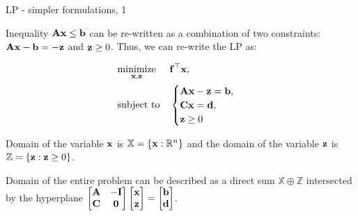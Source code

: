 \documentclass{beamer}
\begin{document}
\begin{frame}{LP - simpler formulations, 1}
	\begin{flushleft}
		
		Inequality $\mathbf{A}\mathbf{x} \leq \mathbf{b}$ can be re-written as a combination of two constraints: $\mathbf{A}\mathbf{x} - \mathbf{b} = -\mathbf{z}$ and $\mathbf{z} \geq 0$. Thus, we can re-write the LP as:
		
		
		\begin{equation}
			\begin{aligned}
				& \underset{\mathbf{x}, \mathbf{z}}{\text{minimize}}
				& & \mathbf{f}^\top \mathbf{x} , \\
				& \text{subject to}
				& & \begin{cases} 
					\mathbf{A}\mathbf{x} - \mathbf{z} = \mathbf{b}, \\
					\mathbf{C}\mathbf{x} = \mathbf{d}, \\
					\mathbf{z} \geq 0
				\end{cases}
			\end{aligned}
		\end{equation}
		
		Domain of the variable $\mathbf{x}$ is $\mathbb{X} = \{ \mathbf{x}:  \mathbb{R}^n \}$ and the domain of the variable $\mathbf{z}$ is $\mathbb{Z} = \{ \mathbf{z}:  \mathbf{z} \geq 0 \}$.
		
		\bigskip 
		
		Domain of the entire problem can be described as a direct sum $\mathbb{X}  \oplus \mathbb{Z}$ intersected by the hyperplane 
		$
		\begin{bmatrix}
			\mathbf{A} & - \mathbf{I} \\
			\mathbf{C} & \mathbf{0}
		\end{bmatrix}
		\begin{bmatrix}
			\mathbf{x} \\
			\mathbf{z} 
		\end{bmatrix}
		=
		\begin{bmatrix}
			\mathbf{b} \\
			\mathbf{d}
		\end{bmatrix}
		$.
		
	\end{flushleft}
\end{frame}
\end{document}
